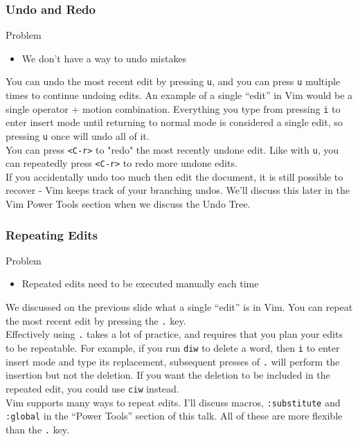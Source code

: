 \documentclass{beamer}
\begin{document}
\begin{frame}[fragile]
    \frametitle{Undo and Redo}
    \begin{block}{Problem}
	\begin{itemize}
	    \item We don't have a way to undo mistakes
	\end{itemize}
    \end{block}
    You can undo the most recent edit by pressing \verb+u+, and you can press \verb+u+ multiple times to continue undoing edits. An example of a single \enquote{edit} in Vim would be a single operator + motion combination. Everything you type from pressing \verb+i+ to enter insert mode until returning to normal mode is considered a single edit, so pressing \verb+u+ once will undo all of it.\\
    \vspace{0.5cm}
    You can press \verb+<C-r>+ to "redo" the most recently undone edit. Like with \verb+u+, you can repeatedly press \verb+<C-r>+ to redo more undone edits.\\
    \vspace{0.5cm}
    If you accidentally undo too much then edit the document, it is still possible to recover - Vim keeps track of your branching undos. We'll discuss this later in the Vim Power Tools section when we discuss the Undo Tree.
\end{frame}

\begin{frame}[fragile]
    \frametitle{Repeating Edits}
    \begin{block}{Problem}
	\begin{itemize}
	    \item Repeated edits need to be executed manually each time
	\end{itemize}
    \end{block}
    We discussed on the previous slide what a single \enquote{edit} is in Vim. You can repeat the most recent edit by pressing the \verb+.+ key.\\
    \vspace{0.5cm}
    Effectively using \verb+.+ takes a lot of practice, and requires that you plan your edits to be repeatable. For example, if you run \verb+diw+ to delete a word, then \verb+i+ to enter insert mode and type its replacement, subsequent presses of \verb+.+ will perform the insertion but not the deletion. If you want the deletion to be included in the repeated edit, you could use \verb+ciw+ instead.\\
    \vspace{0.5cm}
    Vim supports many ways to repeat edits. I'll discuss macros, \verb+:substitute+ and \verb+:global+ in the \enquote{Power Tools} section of this talk. All of these are more flexible than the \verb+.+ key.
\end{frame}
\end{document}
